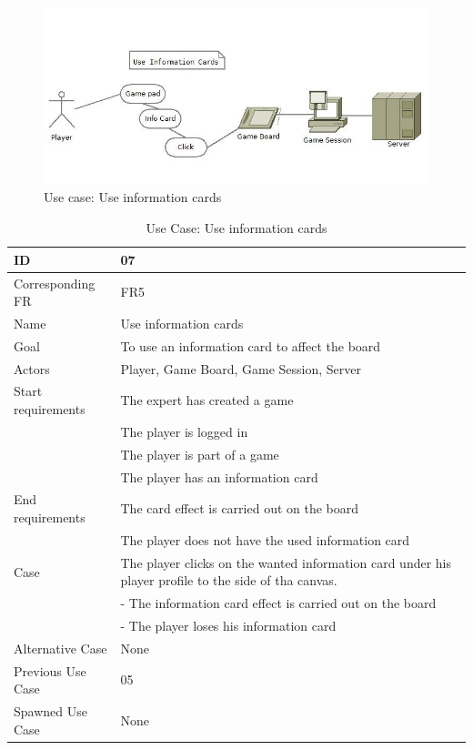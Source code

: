 \begin{figure}[H]
  \centering
    \includegraphics[width=1.0\textwidth]{img/useinfocards.jpg}
  \caption{Use case: Use information cards} 
  \label{fig:useinformationcards}
\end{figure}


\begin{table}[H]
\begin{tabular}{|l|p{14cm}|}
\hline
	\textbf{ID} & \textbf{07}\\ \hline
	Corresponding FR & FR5\\ \hline
	Name & Use information cards\\ \hline
	Goal & To use an information card to affect the board\\ \hline
	Actors & Player, Game Board, Game Session, Server\\ \hline
	Start requirements & The expert has created a game\\
				& The player is logged in\\
				& The player is part of a game\\
				& The player has an information card \\ \hline
	End requirements & The card effect is carried out on the board\\
				& The player does not have the used information card \\ \hline
	Case & The player clicks on the wanted information card under his player profile to the side of tha canvas.\\
		&- The information card effect is carried out on the board\\
		&- The player loses his information card \\ \hline
	Alternative Case & None \\ \hline
	Previous Use Case & 05\\ \hline
	Spawned Use Case & None\\ \hline
\end{tabular}
\caption{Use Case: Use information cards}
\label{fig:usecase07table}
\end{table}



